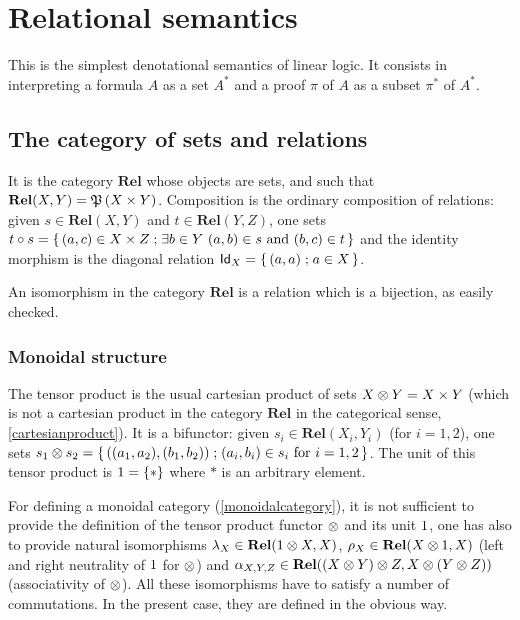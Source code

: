 \chapter{Relational semantics}\label{relational-semantics}

This is the simplest denotational semantics of linear logic. It consists
in interpreting a formula \(A\) as a set \(A^*\) and a proof \(\pi\) of
\(A\) as a subset \(\pi^*\) of \(A^*\).

\section{The category of sets and relations}\label{the-category-of-sets-and-relations}

It is the category \(\mathbf{Rel}\) whose objects are sets, and such
that \(\mathbf{Rel}(X,Y)=\mathfrak{P}\left(X\times Y\right)\). Composition is the
ordinary composition of relations: given \(s\in\mathbf{Rel}(X,Y)\) and
\(t\in\mathbf{Rel}(Y,Z)\), one sets
\(t\circ s=\left\{\,{(a,c)\in X\times Z}\mathrel{;}{\exists b\in Y\ (a,b)\in s\ \text{and}\ (b,c)\in t}\,\right\}\)
and the identity morphism is the diagonal relation
\(\mathsf{Id}_X=\left\{\,{(a,a)}\mathrel{;}{a\in X}\,\right\}\).

An isomorphism in the category \(\mathbf{Rel}\) is a relation which is a
bijection, as easily checked.

\subsection{Monoidal structure}\label{monoidal-structure}

The tensor product is the usual cartesian product of sets
\(X\otimes Y=X\times Y\) (which is not a cartesian product in the category
\(\mathbf{Rel}\) in the categorical sense, \cref{cartesianproduct}). It is a bifunctor: given
\(s_i\in\mathbf{Rel}(X_i,Y_i)\) (for \(i=1,2\)), one sets
\(s_1\tens s_2=\set{((a_1,a_2),(b_1,b_2))}{(a_i,b_i)\in s_i\ \text{for}\ i=1,2}\).
The unit of this tensor product is \(1=\{*\}\) where \(*\) is an
arbitrary element.

For defining a monoidal category (\cref{monoidalcategory}), it is not sufficient to provide the
definition of the tensor product functor \(\otimes\) and its unit
\(1\), one has also to provide natural isomorphisms
\(\lambda_X\in\mathbf{Rel}(1\otimes X,X)\),
\(\rho_X\in\mathbf{Rel}(X\otimes1,X)\) (left and right neutrality of
\(1\) for \(\otimes\)) and
\(\alpha_{X,Y,Z}\in\mathbf{Rel}((X\otimes Y)\otimes Z,X\otimes(Y\otimes Z))\)
(associativity of \(\otimes\)). All these isomorphisms have to satisfy a
number of commutations. In the present case, they are defined in the
obvious way.

